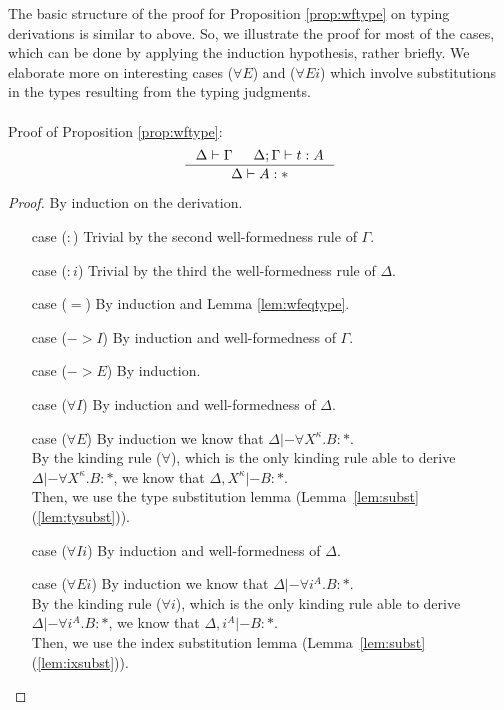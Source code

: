 The basic structure of the proof for Proposition \ref{prop:wftype}
on typing derivations is similar to above. So, we illustrate the proof
for most of the cases, which can be done by applying the induction hypothesis,
rather briefly. We elaborate more on interesting cases ($\forall E$) and
($\forall Ei$) which involve substitutions in the types resulting from
the typing judgments.

\paragraph{}
Proof of Proposition \ref{prop:wftype}:
\[ \inference{ \Delta |- \Gamma & \Delta;\Gamma |- t : A}{ \Delta |- A : * }
\]
\begin{proof} By induction on the derivation.
\begin{itemize}
\item[case] ($:$)
	Trivial by the second well-formedness rule of $\Gamma$.
\item[case] ($:i$)
	Trivial by the third the well-formedness rule of $\Delta$.
\item[case] ($=$)
	By induction and Lemma \ref{lem:wfeqtype}.
\item[case] ($->$$I$)
	By induction and well-formedness of $\Gamma$.
\item[case] ($->$$E$)
	By induction.
\item[case] ($\forall I$)
	By induction and well-formedness of $\Delta$.
\item[case] ($\forall E$)
	By induction we know that $\Delta |- \forall X^\kappa.B : *$.\\
	By the kinding rule ($\forall$), which is the only kinding rule
	able to derive $\Delta |- \forall X^\kappa.B : *$, we know
	that $\Delta,X^\kappa |- B : *$.\\
	Then, we use the type substitution lemma
	(Lemma~\ref{lem:subst}(\ref{lem:tysubst})).
\item[case] ($\forall Ii$)
	By induction and well-formedness of $\Delta$.
\item[case] ($\forall Ei$)
	By induction we know that $\Delta |- \forall i^A.B : *$.\\
	By the kinding rule ($\forall i$), which is the only kinding rule
	able to derive $\Delta |- \forall i^A.B : *$, we know
	that $\Delta,i^A |- B : *$.\\
	Then, we use the index substitution lemma
	(Lemma~\ref{lem:subst}(\ref{lem:ixsubst})).\qedhere
\end{itemize}
\end{proof}




